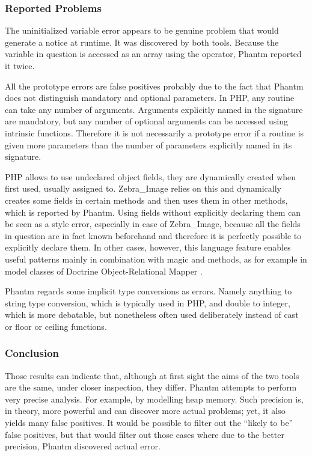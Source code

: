 \subsubsection*{Reported Problems}

The uninitialized variable error appears to be genuine problem that would 
generate a notice at runtime. It was discovered by both tools. Because the 
variable in question is accessed as an array using the \code{[]} operator, 
Phantm reported it twice.

All the prototype errors are false positives probably due to the fact 
that Phantm does not distinguish mandatory and optional parameters. 
In PHP, any routine can take any number of arguments. Arguments explicitly 
named in the signature are mandatory, but any number of optional arguments can be 
accessed using intrinsic functions. Therefore it is not necessarily a prototype 
error if a routine is given more parameters than the number of 
parameters explicitly named in its signature.

PHP allows to use undeclared object fields, they are dynamically created when 
first used, usually assigned to. Zebra\_Image relies on this and dynamically 
creates some fields in certain methods and then uses them in 
other methods, which is reported by Phantm. Using fields without 
explicitly declaring them can be seen as a style error, especially in case 
of Zebra\_Image, because all the fields in question are in fact known 
beforehand and therefore it is perfectly possible to explicitly declare them. 
In other cases, however, this language feature enables useful patterns 
mainly in combination with magic  and  methods, as 
for example in model classes of Doctrine Object-Relational Mapper \cite{doctrine}.

Phantm regards some implicit type conversions as errors. Namely anything to 
string type conversion, which is typically used in PHP, and double to 
integer, which is more debatable, but nonetheless often used deliberately 
instead of cast or floor or ceiling functions.

\subsubsection*{Conclusion}

Those results can indicate that, although at first sight the aims of the
two tools are the same, under closer inspection, they differ. 
Phantm attempts to perform very precise analysis. For example, 
by modelling heap memory. Such precision is, in theory, more powerful 
and can discover more actual problems; yet, it also yields
many false positives. It would be possible to filter out the 
``likely to be'' false positives, but that would filter out those 
cases where due to the better precision, Phantm discovered 
actual error.

